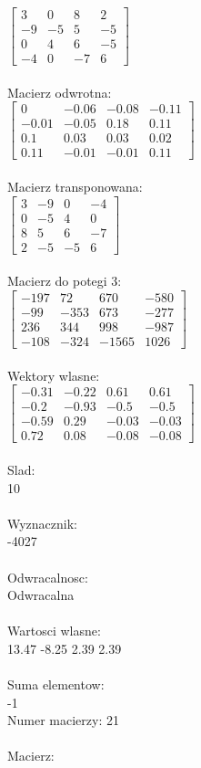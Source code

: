 \documentclass[a4paper,12pt]{article}
\begin{document}
$\begin{bmatrix} 3&0&8&2\\-9&-5&5&-5\\0&4&6&-5\\-4&0&-7&6 \end{bmatrix}$
\\
\\
Macierz odwrotna:\\

$\begin{bmatrix} 0&-0.06&-0.08&-0.11\\-0.01&-0.05&0.18&0.11\\0.1&0.03&0.03&0.02\\0.11&-0.01&-0.01&0.11 \end{bmatrix}$
\\
\\
Macierz transponowana:\\

$\begin{bmatrix} 3&-9&0&-4\\0&-5&4&0\\8&5&6&-7\\2&-5&-5&6 \end{bmatrix}$
\\
\\
Macierz do potegi 3:\\

$\begin{bmatrix} -197&72&670&-580\\-99&-353&673&-277\\236&344&998&-987\\-108&-324&-1565&1026 \end{bmatrix}$
\\
\\
Wektory wlasne:\\

$\begin{bmatrix} -0.31&-0.22&0.61&0.61\\-0.2&-0.93&-0.5&-0.5\\-0.59&0.29&-0.03&-0.03\\0.72&0.08&-0.08&-0.08 \end{bmatrix}$
\\
\\
Slad:\\
10
\\
\\
Wyznacznik:\\
-4027
\\
\\
Odwracalnosc:\\
Odwracalna
\\
\\
Wartosci wlasne:\\
13.47 -8.25 2.39 2.39
\\
\\
Suma elementow:\\
-1
\\
\newpage
Numer macierzy:
21
\\
\\
Macierz:\\
\end{document}
